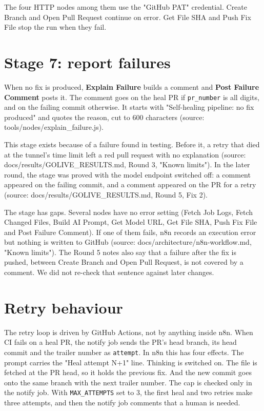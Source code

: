 \documentclass[11pt,a4paper]{report}
\begin{document}
The four HTTP nodes among them use the "GitHub PAT" credential. Create Branch and Open Pull Request continue on error. Get File SHA and Push Fix File stop the run when they fail.

\section{Stage 7: report failures}

When no fix is produced, \textbf{Explain Failure} builds a comment and \textbf{Post Failure Comment} posts it. The comment goes on the heal PR if \texttt{pr\_\allowbreak{}number} is all digits, and on the failing commit otherwise. It starts with "Self-healing pipeline: no fix produced" and quotes the reason, cut to 600 characters (source: tools/nodes/explain\_failure.js).

This stage exists because of a failure found in testing. Before it, a retry that died at the tunnel's time limit left a red pull request with no explanation (source: docs/results/GOLIVE\_RESULTS.md, Round 3, "Known limits"). In the later round, the stage was proved with the model endpoint switched off: a comment appeared on the failing commit, and a comment appeared on the PR for a retry (source: docs/results/GOLIVE\_RESULTS.md, Round 5, Fix 2).

The stage has gaps. Several nodes have no error setting (Fetch Job Logs, Fetch Changed Files, Build AI Prompt, Get Model URL, Get File SHA, Push Fix File and Post Failure Comment). If one of them fails, n8n records an execution error but nothing is written to GitHub (source: docs/architecture/n8n-workflow.md, "Known limits"). The Round 5 notes also say that a failure after the fix is pushed, between Create Branch and Open Pull Request, is not covered by a comment. We did not re-check that sentence against later changes.

\section{Retry behaviour}

The retry loop is driven by GitHub Actions, not by anything inside n8n. When CI fails on a heal PR, the notify job sends the PR's head branch, its head commit and the trailer number as \texttt{attempt}. In n8n this has four effects. The prompt carries the "Heal attempt N+1" line. Thinking is switched on. The file is fetched at the PR head, so it holds the previous fix. And the new commit goes onto the same branch with the next trailer number. The cap is checked only in the notify job. With \texttt{MAX\_\allowbreak{}ATTEMPTS} set to 3, the first heal and two retries make three attempts, and then the notify job comments that a human is needed.
\end{document}
